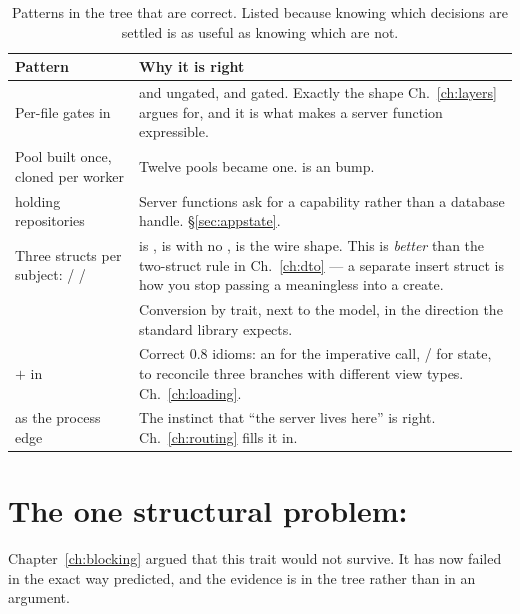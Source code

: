 \begin{table}[htbp]
\centering
\caption{Patterns in the tree that are correct. Listed because knowing which decisions are settled is
as useful as knowing which are not.}
\label{tab:good}
\small
\begin{tabular}{@{}L{0.30\textwidth}L{0.64\textwidth}@{}}
\toprule
\textbf{Pattern} & \textbf{Why it is right} \\
\midrule
Per-file  gates in  &  and  ungated,
 and  gated. Exactly the shape Ch.~\ref{ch:layers} argues for, and it
is what makes a server function expressible. \\
Pool built once,  cloned per worker & Twelve pools became one.
 is an  bump. \\
 holding repositories & Server functions ask for a capability rather than a database
handle. \S\ref{sec:appstate}. \\
Three structs per subject:  /  /  &
 is ,  is  with no
,  is the wire shape. This is \emph{better} than the two-struct
rule in Ch.~\ref{ch:dto} --- a separate insert struct is how you stop passing a meaningless
 into a create. \\
 & Conversion by trait, next to the model, in
the direction the standard library expects. \\
 $+$  in  & Correct 0.8 idioms: an 
for the imperative call, / for state,  to reconcile
three branches with different view types. Ch.~\ref{ch:loading}. \\
 as the process edge & The instinct that ``the server lives here'' is right.
Ch.~\ref{ch:routing} fills it in. \\
\bottomrule
\end{tabular}
\end{table}

\section{The one structural problem: }

Chapter~\ref{ch:blocking} argued that this trait would not survive. It has now failed in the exact
way predicted, and the evidence is in the tree rather than in an argument.

